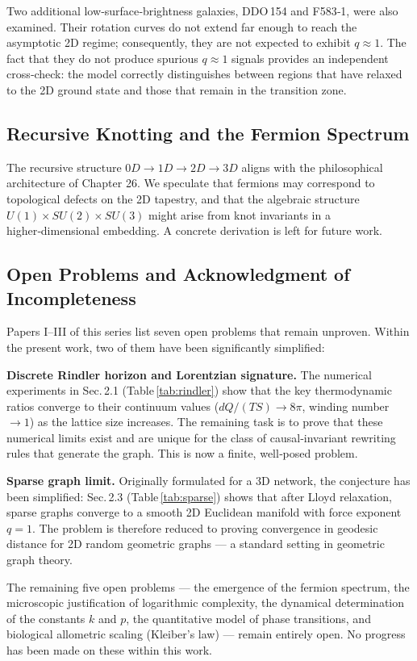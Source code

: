 \documentclass[12pt,a4paper]{article}
\begin{document}
Two additional low‑surface‑brightness galaxies, DDO 154 and F583‑1, were also examined. Their rotation curves do not extend far enough to reach the asymptotic 2D regime; consequently, they are not expected to exhibit $q\approx 1$. The fact that they do not produce spurious $q\approx 1$ signals provides an independent cross‑check: the model correctly distinguishes between regions that have relaxed to the 2D ground state and those that remain in the transition zone.

\subsection{Recursive Knotting and the Fermion Spectrum}
The recursive structure $0D\to1D\to2D\to3D$ aligns with the philosophical architecture of Chapter 26. We speculate that fermions may correspond to topological defects on the 2D tapestry, and that the algebraic structure $U(1)\times SU(2)\times SU(3)$ might arise from knot invariants in a higher‑dimensional embedding. A concrete derivation is left for future work.

\subsection{Open Problems and Acknowledgment of Incompleteness}
Papers I–III of this series list seven open problems that remain unproven. Within the present work, two of them have been significantly simplified:

\textbf{Discrete Rindler horizon and Lorentzian signature.}  
The numerical experiments in Sec. 2.1 (Table \ref{tab:rindler}) show that the key thermodynamic ratios converge to their continuum values ($dQ/(TS)\to 8\pi$, winding number $\to 1$) as the lattice size increases. The remaining task is to prove that these numerical limits exist and are unique for the class of causal‑invariant rewriting rules that generate the graph. This is now a finite, well‑posed problem.

\textbf{Sparse graph limit.}  
Originally formulated for a 3D network, the conjecture has been simplified: Sec. 2.3 (Table \ref{tab:sparse}) shows that after Lloyd relaxation, sparse graphs converge to a smooth 2D Euclidean manifold with force exponent $q=1$. The problem is therefore reduced to proving convergence in geodesic distance for 2D random geometric graphs — a standard setting in geometric graph theory.

The remaining five open problems — the emergence of the fermion spectrum, the microscopic justification of logarithmic complexity, the dynamical determination of the constants $k$ and $p$, the quantitative model of phase transitions, and biological allometric scaling (Kleiber’s law) — remain entirely open. No progress has been made on these within this work.
\end{document}
